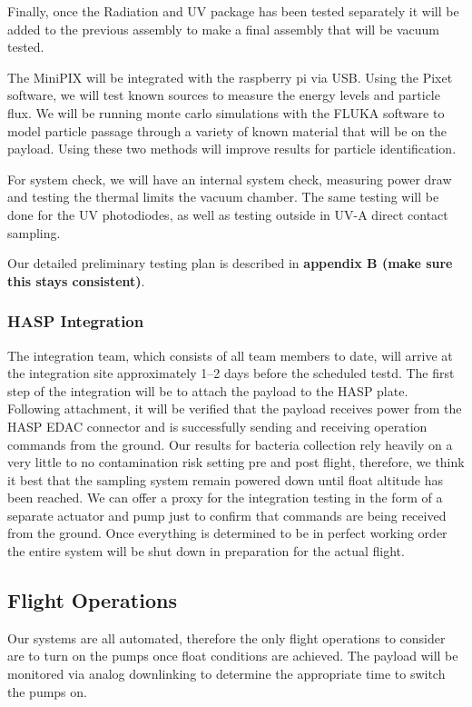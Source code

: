 Finally, once the Radiation and UV package has been tested separately it will be added to the previous assembly to make a final assembly that will be vacuum tested.  

The MiniPIX will be integrated with the raspberry pi via USB. Using the Pixet software, we will test known sources to measure the energy levels and particle flux. We will be running monte carlo simulations with the FLUKA software to model particle passage through a variety of known material that will be on the payload. Using these two methods will improve results for particle identification.

For system check, we will have an internal system check, measuring power draw and testing the thermal limits the vacuum chamber. The same testing will be done for the UV photodiodes, as well as testing outside in UV-A direct contact sampling. 
    
Our detailed preliminary testing plan is described in \textbf{appendix B (make sure this stays consistent)}.  

\subsubsection{HASP Integration}
The integration team, which consists of all team members to date, will arrive at the integration site approximately \numrange{1}{2} days before the scheduled testd. The first step of the integration will be to attach the payload to the HASP plate. Following attachment, it will be verified that the payload receives power from the HASP EDAC connector and is successfully sending and receiving operation commands from the ground. Our results for bacteria collection rely heavily on a very little to no contamination risk setting pre and post flight, therefore, we think it best that the sampling system remain powered down until float altitude has been reached. We can offer a proxy for the integration testing in the form of a separate actuator and pump just to confirm that commands are being received from the ground. Once everything is determined to be in perfect working order the entire system will be shut down in preparation for the actual flight.

\subsection{Flight Operations}
Our systems are all automated, therefore the only flight operations to consider are to turn on the pumps once float conditions are achieved. The payload will be monitored via analog downlinking to determine the appropriate time to switch the pumps on. 

